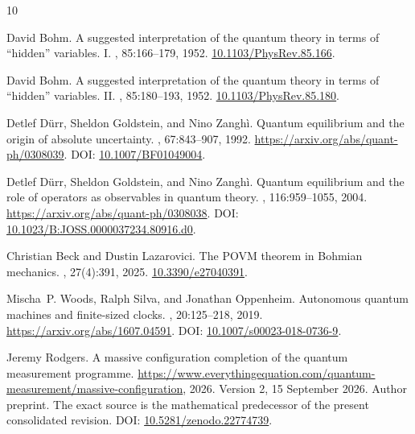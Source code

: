 \documentclass[11pt]{article}
\theoremstyle{definition}\newtheorem{assumption}[theorem]{Constitutive assumption}
\theoremstyle{remark}\newtheorem{remark}[theorem]{Remark}
\begin{document}
\nocite{PortfolioControl,PortfolioReturn,PortfolioEquilibrium,PortfolioPilot,PortfolioRecords,Monograph,OriginalPilot,PriorMassive}
\begin{thebibliography}{10}

David Bohm.
\newblock A suggested interpretation of the quantum theory in terms of
  ``hidden'' variables. {I}.
, 85:166--179, 1952.
\newblock \href{https://doi.org/10.1103/PhysRev.85.166}{10.1103/PhysRev.85.166}.

David Bohm.
\newblock A suggested interpretation of the quantum theory in terms of
  ``hidden'' variables. {II}.
, 85:180--193, 1952.
\newblock \href{https://doi.org/10.1103/PhysRev.85.180}{10.1103/PhysRev.85.180}.

Detlef D{\"u}rr, Sheldon Goldstein, and Nino Zangh{\`i}.
\newblock Quantum equilibrium and the origin of absolute uncertainty.
, 67:843--907, 1992.
\newblock \url{https://arxiv.org/abs/quant-ph/0308039}. DOI:
  \href{https://doi.org/10.1007/BF01049004}{10.1007/BF01049004}.

Detlef D{\"u}rr, Sheldon Goldstein, and Nino Zangh{\`i}.
\newblock Quantum equilibrium and the role of operators as observables in
  quantum theory.
, 116:959--1055, 2004.
\newblock \url{https://arxiv.org/abs/quant-ph/0308038}. DOI:
  \href{https://doi.org/10.1023/B:JOSS.0000037234.80916.d0}{10.1023/B:JOSS.0000037234.80916.d0}.

Christian Beck and Dustin Lazarovici.
\newblock The {POVM} theorem in {Bohmian} mechanics.
, 27(4):391, 2025.
\newblock \href{https://doi.org/10.3390/e27040391}{10.3390/e27040391}.

Mischa~P. Woods, Ralph Silva, and Jonathan Oppenheim.
\newblock Autonomous quantum machines and finite-sized clocks.
, 20:125--218, 2019.
\newblock \url{https://arxiv.org/abs/1607.04591}. DOI:
  \href{https://doi.org/10.1007/s00023-018-0736-9}{10.1007/s00023-018-0736-9}.

Jeremy Rodgers.
\newblock A massive configuration completion of the quantum measurement
  programme.
\newblock
  \url{https://www.everythingequation.com/quantum-measurement/massive-configuration},
  2026.
\newblock Version 2, 15 September 2026. Author preprint. The exact source is
  the mathematical predecessor of the present consolidated revision. DOI:
  \href{https://doi.org/10.5281/zenodo.22774739}{10.5281/zenodo.22774739}.


\end{thebibliography}
\end{document}
